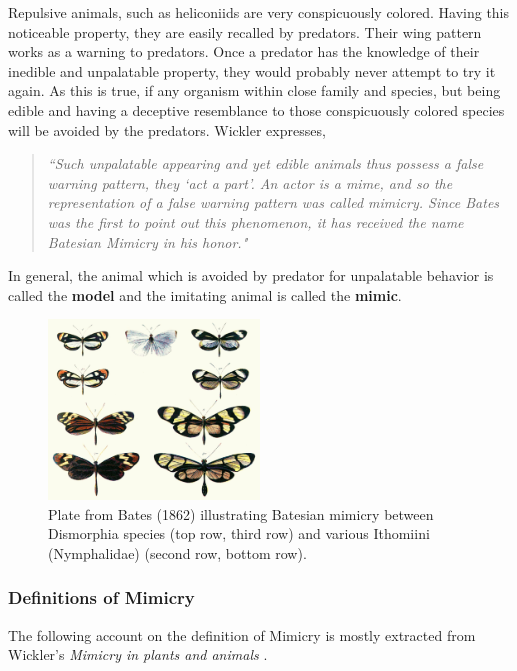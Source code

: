 \documentclass[letterpaper]{article}
\numberwithin{equation}{section}
\begin{document}
Repulsive animals, such as heliconiids are very conspicuously colored. Having this noticeable property, they are easily recalled by predators. Their wing pattern works as a warning to predators. Once a predator has the knowledge of their inedible and unpalatable property, they would probably never attempt to try it again. As this is true, if any organism within close family and species, but being edible and having a deceptive resemblance to those conspicuously colored species will be avoided by the predators. Wickler \cite{wickler1986} expresses,
\begin{quote}
\textsl{``Such unpalatable appearing and yet edible animals thus possess a false warning pattern, they `act a part'. An actor is a mime, and so the representation of a false warning pattern was called \textit{mimicry}. Since Bates was the first to point out this phenomenon, it has received the name \textit{Batesian Mimicry} in his honor."}
\end{quote}
In general, the animal which is avoided by predator for unpalatable behavior is called the \textbf{model} and the imitating animal is called the \textbf{mimic}.

\begin{figure}[H]
	\centering
	\includegraphics[width=0.5\textwidth]{../tex/images/Batesplate_ArM}
	\caption[Plate from Bates (1862) illustrating Batesian mimicry]{Plate from Bates (1862) illustrating Batesian mimicry between Dismorphia species (top row, third row) and various Ithomiini (Nymphalidae) (second row, bottom row). \cite{bates1862}}
	\label{fig:batesian-butterfly}
\end{figure}

\subsubsection{Definitions of Mimicry}
The following account on the definition of Mimicry is mostly extracted from Wickler's \textit{Mimicry in plants and animals} \cite{wickler1986}. 
\end{document}
